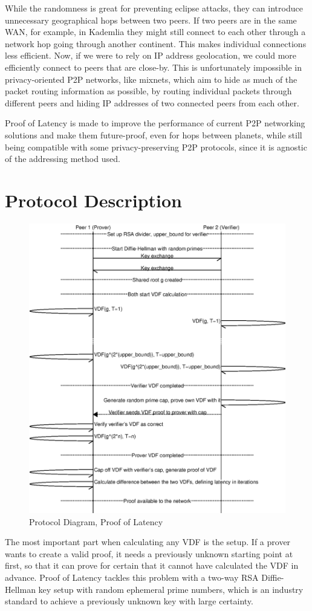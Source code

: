 While the randomness is great for preventing eclipse attacks, they can introduce unnecessary geographical hops between two peers. If two peers are in the same WAN, for example, in Kademlia they might still connect to each other through a network hop going through another continent. This makes individual connections less efficient.
Now, if we were to rely on IP address geolocation, we could more efficiently connect to peers that are close-by. This is unfortunately impossible in privacy-oriented P2P networks, like mixnets, which aim to hide as much of the packet routing information as possible, by routing individual packets through different peers and hiding IP addresses of two connected peers from each other.\cite{Harry_Halpin_undated-sq}

Proof of Latency is made to improve the performance of current P2P networking solutions and make them future-proof, even for hops between planets, while still being compatible with some privacy-preserving P2P protocols, since it is agnostic of the addressing method used.

\section{Protocol Description}
\begin{figure}
  \includegraphics[width=\textwidth]{pictures/pol2_diagram.eps}
  \caption{Protocol Diagram, Proof of Latency}
  \label{PoL Diagram 2}
\end{figure}
The most important part when calculating any VDF is the setup. If a prover wants to create a valid proof, it needs a previously unknown starting point at first, so that it can prove for certain that it cannot have calculated the VDF in advance. Proof of Latency tackles this problem with a two-way RSA Diffie-Hellman key setup with random ephemeral prime numbers, which is an industry standard to achieve a previously unknown key with large certainty. 

